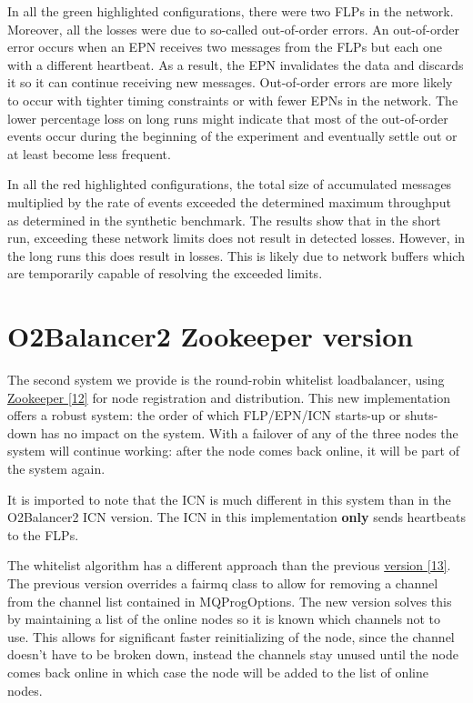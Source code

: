 \documentclass[]{article}
\begin{document}
In all the green highlighted configurations, there were two FLPs in the network. Moreover, all the losses were due to so-called out-of-order errors. An out-of-order error occurs when an EPN receives two messages from the FLPs but each one with a different heartbeat. As a result, the EPN invalidates the data and discards it so it can continue receiving new messages. Out-of-order errors are more likely to occur with tighter timing constraints or with fewer EPNs in the network. The lower percentage loss on long runs might indicate that most of the out-of-order events occur during the beginning of the experiment and eventually settle out or at least become less frequent.

In all the red highlighted configurations, the total size of accumulated messages multiplied by the rate of events exceeded the determined maximum throughput as determined in the synthetic benchmark. The results show that in the short run, exceeding these network limits does not result in detected losses. However, in the long runs this does result in losses. This is likely due to network buffers which are temporarily capable of resolving the exceeded limits.


\section{O2Balancer2 Zookeeper version}
The second system we provide is the round-robin whitelist loadbalancer, using \hyperref[sec:ref12]{Zookeeper [12]} for node registration and distribution. This new implementation offers a robust system: the order of which FLP/EPN/ICN starts-up or shuts-down has no impact on the system. With a failover of any of the three nodes the system will continue working: after the node comes back online, it will be part of the system again. 

It is imported to note that the ICN is much different in this system than in the O2Balancer2 ICN version. The ICN in this implementation \textbf{only} sends heartbeats to the FLPs.

The whitelist algorithm has a different approach than the previous \hyperref[sec:ref13]{version [13]}. The previous version overrides a fairmq class to allow for removing a channel from the channel list contained in MQProgOptions.  The new version solves this by maintaining a list of the online nodes so it is known which channels not to use. This allows for significant faster reinitializing of the node, since the channel doesn’t have to be broken down, instead the channels stay unused until the node comes back online in which case the node will be added to the list of online nodes. 
\end{document}
